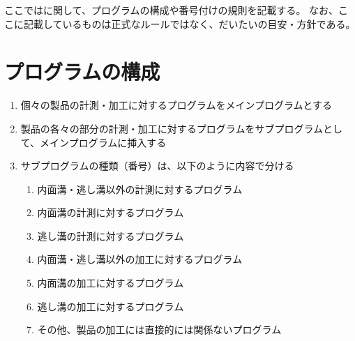 
ここでは\DMname に関して、プログラムの構成や番号付けの規則を記載する。
なお、ここに記載しているものは正式なルールではなく、だいたいの目安・方針である。


\section{プログラムの構成}
\begin{enumerate}
\item 個々の製品の計測・加工に対するプログラムをメインプログラムとする
\item 製品の各々の部分の計測・加工に対するプログラムをサブプログラムとして、メインプログラムに挿入する
\item サブプログラムの種類（番号）は、以下のように内容で分ける
  \begin{enumerate}
  \item 内面溝・逃し溝以外の計測に対するプログラム
  \item 内面溝の計測に対するプログラム
  \item 逃し溝の計測に対するプログラム
  \item 内面溝・逃し溝以外の加工に対するプログラム
  \item 内面溝の加工に対するプログラム
  \item 逃し溝の加工に対するプログラム
  \item その他、製品の加工には直接的には関係ないプログラム
  \end{enumerate}
\end{enumerate}



